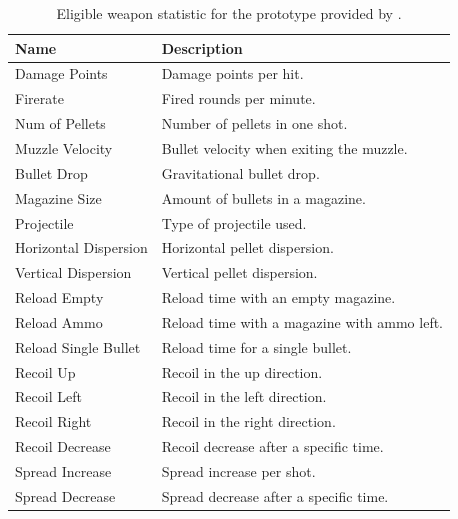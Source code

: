 \documentclass[MGS,Master,english]{twbook}%
\begin{document}
\begin{table}[!ht]
	\centering
	\begin{tabular}{|l|l|}
		\hline
		\textbf{Name}         & \textbf{Description}                         \\ \hline\hline
		Damage Points         & Damage points per hit.                       \\ \hline
		Firerate              & Fired rounds per minute.                     \\ \hline
		Num of Pellets        & Number of pellets in one shot.               \\ \hline
		Muzzle Velocity       & Bullet velocity when exiting the muzzle.     \\ \hline
		Bullet Drop           & Gravitational bullet drop.                   \\ \hline
		Magazine Size         & Amount of bullets in a magazine.             \\ \hline
		Projectile            & Type of projectile used.                     \\ \hline
		Horizontal Dispersion & Horizontal pellet dispersion.                \\ \hline
		Vertical Dispersion   & Vertical pellet dispersion.                  \\ \hline
		Reload Empty          & Reload time with an empty magazine.          \\ \hline
		Reload Ammo           & Reload time with a magazine with ammo left. \\ \hline
		Reload Single Bullet  & Reload time for a single bullet.             \\ \hline
		Recoil Up             & Recoil in the up direction.                      \\ \hline
		Recoil Left           & Recoil in the left direction.                    \\ \hline
		Recoil Right          & Recoil in the right direction.                   \\ \hline
		Recoil Decrease       & Recoil decrease after a specific time.       \\ \hline
		Spread Increase       & Spread increase per shot.                    \\ \hline
		Spread Decrease       & Spread decrease after a specific time.       \\ \hline
	\end{tabular}
	\caption{Eligible weapon statistic for the prototype provided by \protect\cite{symthic::bf1stats}.}
	\label{battlefield::weaponStats}
\end{table}
\end{document}
